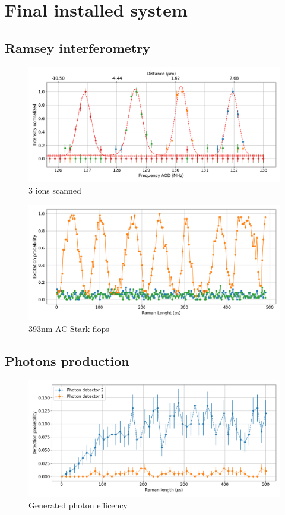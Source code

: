 \documentclass[english, a4paper, 12pt, twoside]{book}
\numberwithin{equation}{section} %
\begin{document}
\section{Final installed system}
\subsection{Ramsey interferometry}
\begin{figure}[H]
\centering
\includegraphics[width=\textwidth]{img/AODscan}
\caption{3 ions scanned}
\end{figure}
\begin{figure}[H]
\centering
\includegraphics[width=\textwidth]{img/ac_stark}
\caption{393nm AC-Stark flops}
\end{figure}

\subsection{Photons production}
\begin{figure}[H]
\centering
\includegraphics[width=\textwidth]{img/photonefficency_witherror}
\caption{Generated photon efficency}
\end{figure}
\end{document}
